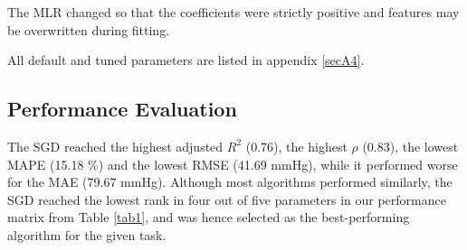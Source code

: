 \documentclass[referee,lineno,pdflatex,sn-nature]{sn-jnl}%
\theoremstyle{thmstyleone}%
\theoremstyle{thmstyletwo}%
\theoremstyle{thmstylethree}%
\begin{document}
The MLR changed so that the coefficients were strictly positive and features may be overwritten during fitting.

All default and tuned parameters are listed in appendix \ref{secA4}.

\subsection{Performance Evaluation}\label{sec3.5}
The SGD reached the highest adjusted $R^2$ (0.76), the highest $\rho$ (0.83), the lowest MAPE (15.18 \%) and the lowest RMSE (41.69 mmHg), while it performed worse for the MAE (79.67 mmHg). Although most algorithms performed similarly, the SGD reached the lowest rank in four out of five parameters in our performance matrix from Table \ref{tab1}, and was hence selected as the best-performing algorithm for the given task.
\end{document}
